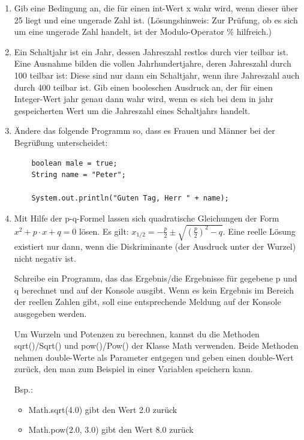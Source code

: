 \documentclass[final,a4paper]{article}
\begin{document}
\begin{enumerate}
\item{
Gib eine Bedingung an, die für einen int-Wert x wahr wird, wenn dieser über 25 liegt und eine ungerade Zahl ist. (Lösungshinweis:  Zur Prüfung, ob es sich um eine ungerade Zahl handelt, ist der Modulo-Operator \% hilfreich.)

}

\item{
Ein Schaltjahr ist ein Jahr, dessen Jahreszahl restlos durch vier teilbar ist. Eine Ausnahme bilden die vollen Jahrhundertjahre, deren Jahreszahl durch 100 teilbar ist: Diese sind nur dann ein Schaltjahr, wenn ihre Jahreszahl auch durch 400 teilbar ist.
Gib einen booleschen Ausdruck an, der für einen Integer-Wert jahr genau dann wahr wird, wenn es sich bei dem in jahr gespeicherten Wert um die Jahreszahl eines Schaltjahrs handelt.
}

\item{
Ändere das folgende Programm so, dass es Frauen und Männer bei der Begrüßung unterscheidet:
\begin{lstlisting}
	boolean male = true;
	String name = "Peter";
	
	System.out.println("Guten Tag, Herr " + name);
\end{lstlisting}
}

\item{
Mit Hilfe der p-q-Formel lassen sich quadratische Gleichungen der Form \(x^2 + p \cdot x + q = 0\) lösen. Es gilt: \(x_{1/2} = - \frac{p}{2} \pm \sqrt{\left( \frac{p}{2}\right)^2 -q}\). Eine reelle Lösung existiert nur dann, wenn die Diskriminante (der Ausdruck unter der Wurzel) nicht negativ ist. 

Schreibe ein Programm, das das Ergebnis/die Ergebnisse für gegebene p und q berechnet und auf der Konsole ausgibt. Wenn es kein Ergebnis im Bereich der reellen Zahlen gibt, soll eine entsprechende Meldung auf der Konsole ausgegeben werden. 

Um Wurzeln und Potenzen zu berechnen, kannst du die Methoden sqrt()/Sqrt() und pow()/Pow() der Klasse Math verwenden. Beide Methoden nehmen double-Werte als Parameter entgegen und geben einen double-Wert zurück, den man zum Beispiel in einer Variablen speichern kann.

Bsp.: 
\begin{itemize}
\item Math.sqrt(4.0) gibt den Wert 2.0 zurück
\item Math.pow(2.0, 3.0) gibt den Wert 8.0 zurück
\end{itemize}

}
\end{enumerate}
\end{document}
